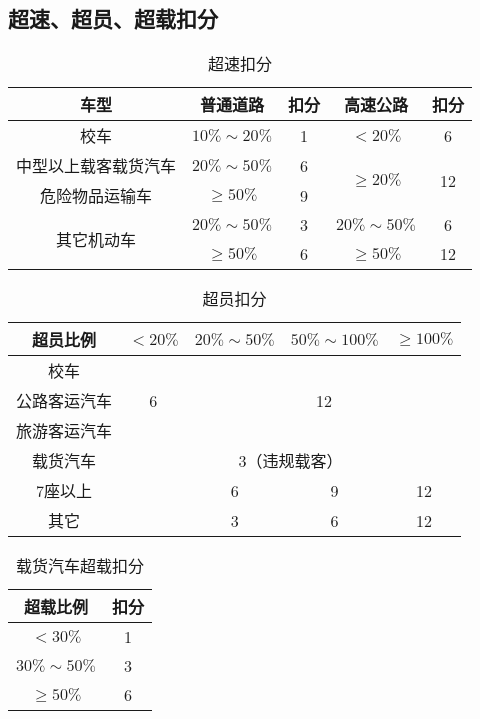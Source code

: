 \subsection{超速、超员、超载扣分}

\begin{table}[htbp]
\centering
\caption{超速扣分}
    \begin{tabular}{|c|c|c|c|c|}
        \hline
        \textbf{车型}  & \textbf{普通道路}  & \textbf{扣分}  & \textbf{高速公路}  & \textbf{扣分} \\
        \hline
        校车 & $10\% \sim 20\% $ & 1 & $< 20\%$ & 6 \\
        \cline{2-5}
        中型以上载客载货汽车 & $20\% \sim 50\%$ & 6 & \multirow{2}{*}{$\ge 20\%$} & \multirow{2}{*}{12} \\
        \cline{2-3}
        危险物品运输车 & $\ge 50\%$ & 9 & & \\
        \hline
        \multirow{2}{*}{其它机动车 } & $20\% \sim 50\%$ & 3 & $20\% \sim 50\%$ & 6\\
        \cline{2-5}
         & $\ge 50\%$ & 6 & $\ge 50\%$ & 12 \\
        \hline
    \end{tabular}
    \label{tab:speeding}
\end{table}
\begin{table}[htbp]
\centering
\caption{超员扣分}
    \begin{tabular}{|c|c|c|c|c|}
        \hline
        \textbf{超员比例}  & \textbf{$< 20\%$} & \textbf{$20\% \sim 50\%$} & \textbf{$50\% \sim 100\%$} & \textbf{$\ge 100\%$}\\
        \hline
         校车 & \multirow{3}{*}{6} & \multicolumn{3}{c|}{} \\
        \cline{1-1}
        公路客运汽车 & & \multicolumn{3}{c|}{12}  \\
        \cline{1-1}
        旅游客运汽车 & & \multicolumn{3}{c|}{} \\
        \hline
        载货汽车 & \multicolumn{4}{c|}{3（违规载客）} \\
        \hline
        7座以上 & & 6 & 9 & 12 \\
        \cline{1-1} \cline{3-5}
        其它 & & 3 & 6 & 12 \\
        \hline
    \end{tabular}
    \label{tab:overcrowding}
\end{table}

\begin{table}[htbp]
\centering
\caption{载货汽车超载扣分}
    \begin{tabular}{|c|c|}
        \hline
        \textbf{超载比例}  & \textbf{扣分} \\
        \hline
        $< 30\%$ & 1 \\
        \hline
        $30\% \sim 50\%$ & 3 \\
        \hline
        $\ge 50\%$ & 6 \\
        \hline
    \end{tabular}
    \label{tab:overloading}
\end{table}

